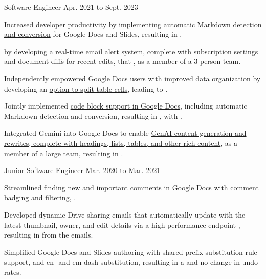 \begin{cventry}
    {}
    {Software Engineer}
    {Apr. 2021 to Sept. 2023}{}
    \begin{cvitems}
        \item Increased developer productivity by implementing \href{https://workspaceupdates.googleblog.com/2022/03/compose-with-markdown-in-google-docs-on.html}{automatic Markdown detection and conversion} for Google Docs and Slides, resulting in .
        \item {} by developing a \href{https://workspaceupdates.googleblog.com/2022/07/edit-notifications-for-document-content-changes.html}{real-time email alert system, complete with subscription settings and document diffs for recent edits}, that , as a member of a 3-person team.
        \item Independently empowered Google Docs users with improved data organization by developing an \href{https://workspaceupdates.googleblog.com/2022/10/split-table-cells-in-google-docs.html}{option to split table cells}, leading to .
        \item Jointly implemented \href{https://workspaceupdates.googleblog.com/2022/12/format-display-code-google-docs.html}{code block support in Google Docs}, including automatic Markdown detection and conversion, resulting in , with .
        \item Integrated Gemini into Google Docs to enable \href{https://workspace.google.com/blog/product-announcements/generative-ai}{GenAI content generation and rewrites, complete with headings, lists, tables, and other rich content}, as a member of a large team, resulting in .
    \end{cvitems}
\end{cventry}

\begin{cventry}
    {}
    {Junior Software Engineer}
    {Mar. 2020 to Mar. 2021}{}
    \begin{cvitems}
        \item Streamlined finding new and important comments in Google Docs with \href{https://workspaceupdates.googleblog.com/2021/02/improvements-for-locating-new-comments-important-conversations-google-docs.html}{comment badging and filtering}, .
        \item Developed dynamic Drive sharing emails that automatically update with the latest thumbnail, owner, and edit details via a high-performance endpoint , resulting in  from the emails.
        \item Simplified Google Docs and Slides authoring with shared prefix substitution rule support, and en- and em-dash substitution, resulting in a  and no change in undo rates.
    \end{cvitems}
\end{cventry}
